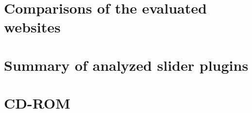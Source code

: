 \begin{appendices}
\section{Comparisons of the evaluated websites}


\section{Summary of analyzed slider plugins}


\section{CD-ROM}

\end{appendices}